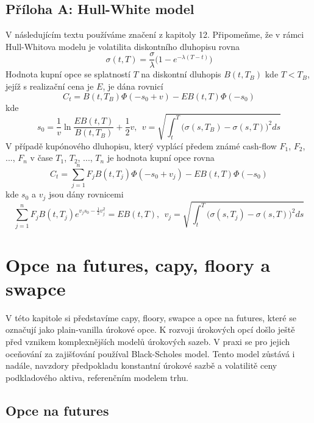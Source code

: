 \documentclass[a4paper]{book}
\begin{document}
\section{Příloha A: Hull-White model}

V následujícím textu používáme značení z kapitoly 12. Připomeňme, že v rámci Hull-Whitova modelu je volatilita diskontního dluhopisu rovna
\begin{equation*}
\sigma(t,T) = \frac{\sigma}{\lambda}\big( 1 - e^{-\lambda(T - t)}\big)
\end{equation*}
Hodnota kupní opce se splatností $T$ na diskontní dluhopis $B(t,T_B)$ kde $T < T_B$, jejíž s realizační cena je $E$, je dána rovnicí
\begin{equation*}
C_t = B(t, T_B)\Phi(-s_0 + v) - EB(t,T)\Phi(-s_0)
\end{equation*}
kde
\begin{equation*}
s_0 = \frac{1}{v}\ln \frac{EB(t,T)}{B(t,T_B)} + \frac{1}{2}v,~~ v = \sqrt{\int_t^T\big( \sigma(s, T_B) - \sigma(s,T)\big)^2 ds}
\end{equation*}
V případě kupónového dluhopisu, který vyplácí předem známé cash-flow $F_1$, $F_2$, ..., $F_n$ v čase $T_1$, $T_2$, ..., $T_n$ je hodnota kupní opce rovna
\begin{equation*}
C_t = \sum_{j=1}^n F_j B(t,T_j)\Phi(-s_0 + v_j) - EB(t,T)\Phi(-s_0)
\end{equation*}
kde $s_0$ a $v_j$ jsou dány rovnicemi
\begin{equation*}
\sum_{j=1}^n F_jB(t,T_j)e^{v_js_0 - \frac{1}{2}v_j^2} = EB(t,T),~~ v_j = \sqrt{\int_t^T\big( \sigma(s, T_j) - \sigma(s,T)\big)^2 ds}
\end{equation*}

\chapter{Opce na futures, capy, floory a swapce}

V této kapitole si představíme capy, floory, swapce a opce na futures, které se označují jako plain-vanilla úrokové opce. K rozvoji úrokových opcí došlo ještě před vznikem komplexnějších modelů úrokových sazeb. V praxi se pro jejich oceňování za zajišťování používal Black-Scholes model. Tento model zůstává i nadále, navzdory předpokladu konstantní úrokové sazbě a volatilitě ceny podkladového aktiva, referenčním modelem trhu.

\section{Opce na futures}
\end{document}
